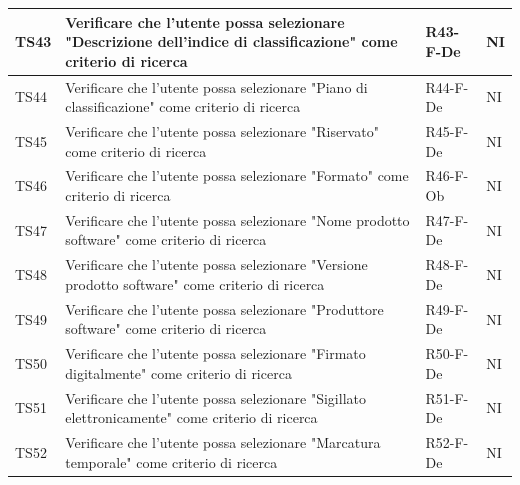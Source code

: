 \documentclass[a4paper,12pt]{article}
\begin{document}
\begin{longtable}{|M{1.2cm}|M{6.3cm}|M{2.5cm}|M{1.5cm}|}
                TS43 & Verificare che l'utente possa selezionare "Descrizione dell'indice di classificazione" come criterio di ricerca & R43-F-De & NI \\
                \hline

                TS44 & Verificare che l'utente possa selezionare "Piano di classificazione" come criterio di ricerca & R44-F-De & NI \\
                \hline
            
                TS45 & Verificare che l'utente possa selezionare "Riservato" come criterio di ricerca & R45-F-De & NI \\
                \hline
                
                TS46 & Verificare che l'utente possa selezionare "Formato" come criterio di ricerca & R46-F-Ob & NI \\
                \hline
                
                TS47 & Verificare che l'utente possa selezionare "Nome prodotto software" come criterio di ricerca & R47-F-De & NI \\
                \hline
                                
                TS48 & Verificare che l'utente possa selezionare "Versione prodotto software" come criterio di ricerca & R48-F-De & NI \\
                \hline
                                
                TS49 & Verificare che l'utente possa selezionare "Produttore software" come criterio di ricerca & R49-F-De & NI \\
                \hline
                                
                TS50 & Verificare che l'utente possa selezionare "Firmato digitalmente" come criterio di ricerca & R50-F-De & NI \\
                \hline
                                
                TS51 & Verificare che l'utente possa selezionare "Sigillato elettronicamente" come criterio di ricerca & R51-F-De & NI \\
                \hline
                                
                TS52 & Verificare che l'utente possa selezionare "Marcatura temporale" come criterio di ricerca & R52-F-De & NI \\
                \hline
                                

\end{longtable}
\end{document}
